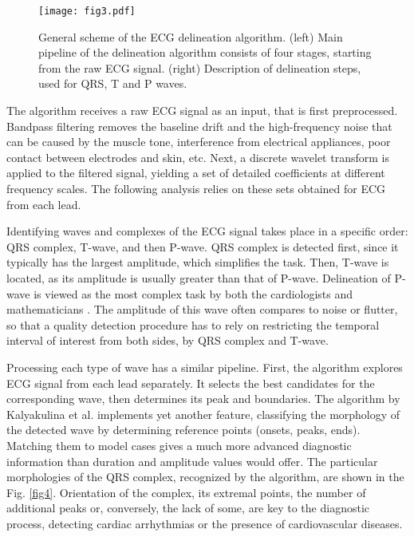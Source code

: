\documentclass[submitted]{ieeeaccess}
\begin{document}
\begin{figure}
    \centering
	\texttt{[image: fig3.pdf]}
	
	\caption{{General scheme of the ECG delineation algorithm.}
		(left) Main pipeline of the delineation algorithm consists of four stages, starting from the raw ECG signal. (right) Description of delineation steps, used for QRS, T and P waves.}
	\label{fig3}
\end{figure}

The algorithm receives a raw ECG signal as an input, that is first preprocessed. Bandpass filtering removes the baseline drift and the high-frequency noise that can be caused by the muscle tone, interference from electrical appliances, poor contact between electrodes and skin, etc. Next, a discrete wavelet transform is applied to the filtered signal, yielding a set of detailed coefficients at different frequency scales. The following analysis relies on these sets obtained for ECG from each lead. 

Identifying waves and complexes of the ECG signal takes place in a specific order: QRS complex, T-wave, and then P-wave. QRS complex is detected first, since it typically has the largest amplitude, which simplifies the task. Then, T-wave is located, as its amplitude is usually greater than that of P-wave. Delineation of P-wave is viewed as the most complex task by both the cardiologists and mathematicians \cite{DiMarco2011, Martinez2004}. The amplitude of this wave often compares to noise or flutter, so that a quality detection procedure has to rely on restricting the temporal interval of interest from both sides, by QRS complex and T-wave.

Processing each type of wave has a similar pipeline. First, the algorithm explores ECG signal from each lead separately. It selects the best candidates for the corresponding wave, then determines its peak and boundaries. The algorithm by Kalyakulina et al. \cite{Kalyakulina2018} implements yet another feature, classifying the morphology of the detected wave by determining reference points (onsets, peaks, ends). Matching them to model cases gives a much more advanced diagnostic information than duration and amplitude values would offer. The particular morphologies of the QRS complex, recognized by the algorithm, are shown in the Fig. \ref{fig4}. Orientation of the complex, its extremal points, the number of additional peaks or, conversely, the lack of some, are key to the diagnostic process, detecting cardiac arrhythmias or the presence of cardiovascular diseases.
\end{document}
